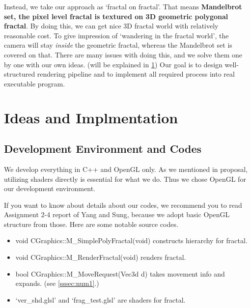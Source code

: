 \documentclass[a4paper]{article}
\begin{document}
Instead, we take our approach as `fractal on fractal'.
That means \textbf{Mandelbrot set, the pixel level fractal is textured on 3D geometric polygonal fractal}.
By doing this, we can get nice 3D fractal world with relatively reasonable cost.
To give impression of `wandering in the fractal world', the camera will stay \textit{inside} the geometric fractal, whereas the Mandelbrot set is covered on that.
There are many issues with doing this, and we solve them one by one with our own ideas. (will be explained in \ref{sec:2})
Our goal is to design well-structured rendering pipeline and to implement all required process into real executable program.


\section{Ideas and Implmentation}\label{sec:2}
\subsection{Development Environment and Codes}
We develop everything in C++ and OpenGL only.
As we mentioned in proposal, utilizing shaders directly is essential for what we do.
Thus we chose OpenGL for our development environment.

If you want to know about details about our codes,
we recommend you to read Assignment 2-4 report of Yang and Sung, because we adopt basic OpenGL structure from those.
Here are some notable source codes.
\begin{itemize}
  \item void CGraphics::M\_SimplePolyFractal(void) constructs hierarchy for fractal.
  \item void CGraphics::M\_RenderFractal(void) renders fractal.
  \item bool CGraphics::M\_MoveRequest(Vec3d d) takes movement info and expands. (see \ref{sssec:num1}.)
  \item `ver\_shd.glsl' and `frag\_test.glsl' are shaders for fractal.
\end{itemize}
\end{document}
